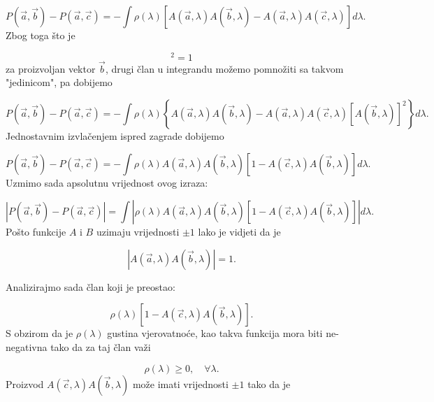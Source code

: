 \begin{equation}
    P(\vec{a}, \vec{b}) - P(\vec{a}, \vec{c})  = - \int \rho (\lambda) [A(\vec{a}, \lambda) A(\vec{b}, \lambda) - A(\vec{a}, \lambda) A(\vec{c}, \lambda) ] d\lambda.
\end{equation}
Zbog toga što je

\begin{equation}
    [A(\vec{b}, \lambda)]^2 = 1
\end{equation}
za proizvoljan vektor $\vec{b}$, drugi član u integrandu možemo pomnožiti sa takvom "jedinicom", pa dobijemo

\begin{equation}
    P(\vec{a}, \vec{b}) - P(\vec{a}, \vec{c})  = - \int \rho (\lambda) \left\{A(\vec{a}, \lambda) A(\vec{b}, \lambda) - A(\vec{a}, \lambda) A(\vec{c}, \lambda)[A(\vec{b}, \lambda)]^2 \right\}d\lambda.
\end{equation}
Jednostavnim izvlačenjem ispred zagrade dobijemo

\begin{equation}
    P(\vec{a}, \vec{b}) - P(\vec{a}, \vec{c})  = - \int \rho (\lambda) A(\vec{a}, \lambda) A(\vec{b}, \lambda) [1- A(\vec{c}, \lambda) A(\vec{b}, \lambda) ] d\lambda.
\end{equation}
Uzmimo sada apsolutnu vrijednost ovog izraza:

\begin{equation}
    \left|{P(\vec{a}, \vec{b}) - P(\vec{a}, \vec{c})}\right| =  \int \left| \rho (\lambda) A(\vec{a}, \lambda) A(\vec{b}, \lambda) [1- A(\vec{c}, \lambda) A(\vec{b}, \lambda)  ] \right| d\lambda.
\end{equation}
Pošto funkcije $A$ i $B$ uzimaju vrijednosti $\pm 1$ lako je vidjeti da je

\begin{equation}
    \left|A(\vec{a}, \lambda) A(\vec{b}, \lambda)\right| = 1.
\end{equation}

Analizirajmo sada član koji je preostao:

\begin{equation}
    \rho (\lambda)[1 - A(\vec{c}, \lambda) A(\vec{b}, \lambda) ].
\end{equation}
S obzirom da je $\rho(\lambda)$ gustina vjerovatnoće, kao takva funkcija mora biti ne-negativna tako da za taj član važi

\begin{equation}
    \rho(\lambda) \ge0 , \quad \forall \lambda.
\end{equation}
Proizvod $A(\vec{c}, \lambda) A(\vec{b}, \lambda)$ može imati vrijednosti $\pm 1$ tako da je

